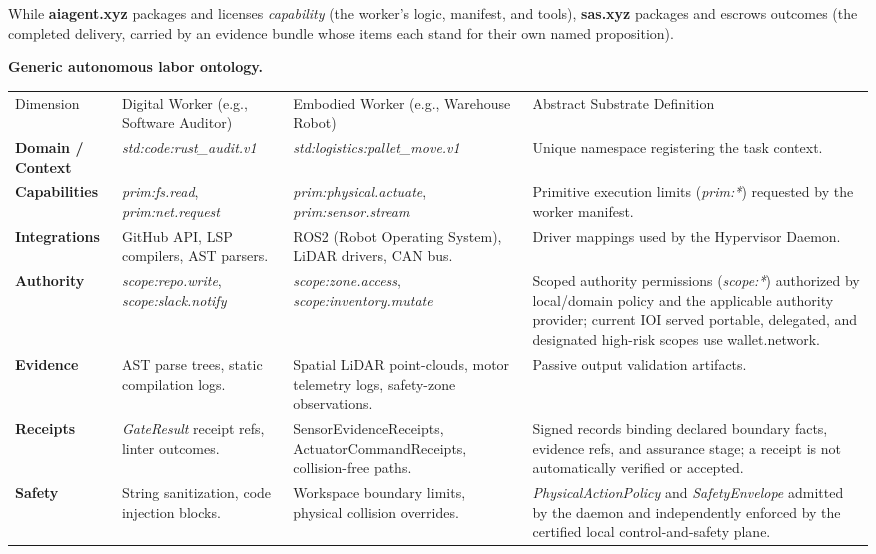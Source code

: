 \documentclass[
  11pt,
]{article}
\begin{document}
While \textbf{aiagent.xyz} packages and licenses \emph{capability} (the
worker's logic, manifest, and tools), \textbf{sas.xyz} packages and
escrows outcomes (the completed delivery, carried by an evidence bundle
whose items each stand for their own named proposition).

\textbf{Generic autonomous labor ontology.}

\begin{longtable}[]{@{}
  >{\raggedright\arraybackslash}p{}
  >{\raggedright\arraybackslash}p{}
  >{\raggedright\arraybackslash}p{}
  >{\raggedright\arraybackslash}p{}@{}}
\toprule\noalign{}
& & & \\
\midrule\noalign{}
\endhead
\bottomrule\noalign{}
\endlastfoot
Dimension & Digital Worker (e.g., Software Auditor) & Embodied Worker
(e.g., Warehouse Robot) & Abstract Substrate Definition \\
\textbf{Domain / Context} & \emph{std:code:rust\_audit.v1} &
\emph{std:logistics:pallet\_move.v1} & Unique namespace registering the
task context. \\
\textbf{Capabilities} & \emph{prim:fs.read}, \emph{prim:net.request} &
\emph{prim:physical.actuate}, \emph{prim:sensor.stream} & Primitive
execution limits (\emph{prim:*}) requested by the worker manifest. \\
\textbf{Integrations} & GitHub API, LSP compilers, AST parsers. & ROS2
(Robot Operating System), LiDAR drivers, CAN bus. & Driver mappings used
by the Hypervisor Daemon. \\
\textbf{Authority} & \emph{scope:repo.write}, \emph{scope:slack.notify}
& \emph{scope:zone.access}, \emph{scope:inventory.mutate} & Scoped
authority permissions (\emph{scope:*}) authorized by local/domain policy and
the applicable authority provider; current IOI served portable, delegated, and
designated high-risk scopes use wallet.network. \\
\textbf{Evidence} & AST parse trees, static compilation logs. & Spatial
LiDAR point-clouds, motor telemetry logs, safety-zone observations. &
Passive output validation artifacts. \\
\textbf{Receipts} & \emph{GateResult} receipt refs, linter outcomes. &
SensorEvidenceReceipts, ActuatorCommandReceipts, collision-free paths. &
Signed records binding declared boundary facts, evidence refs, and assurance
stage; a receipt is not automatically verified or accepted. \\
\textbf{Safety} & String sanitization, code injection blocks. &
Workspace boundary limits, physical collision overrides. &
\emph{PhysicalActionPolicy} and \emph{SafetyEnvelope} admitted by the daemon
and independently enforced by the certified local control-and-safety plane. \\
\end{longtable}
\end{document}
